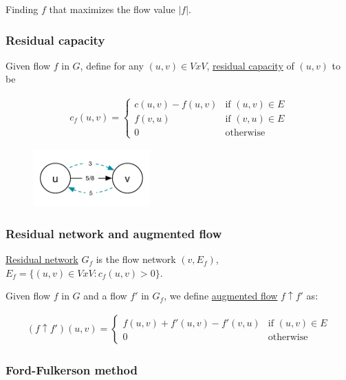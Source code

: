 \documentclass[12pt]{article}
\begin{document}
Finding $f$ that maximizes the flow value $|f|$.

\subsubsection*{Residual capacity}

Given flow $f$ in $G$, define for any $(u,v) \in VxV$, \underline{residual capacity} of $(u,v)$ to be

\begin{align*}
  c_f(u,v) = \begin{cases}
               c(u,v) - f(u,v) & \text{if } (u,v) \in E\\
               f(v,u)          & \text{if } (v,u) \in E\\
               0               & \text{otherwise}
           \end{cases}
\end{align*}

\begin{figure}[h!]
  \centering
    \includegraphics[width=0.4\textwidth]{figures/2}
\end{figure}

\subsubsection*{Residual network and augmented flow}

\underline{Residual network} $G_f$ is the flow network $(v, E_f)$, $E_f = \{ (u,v) \in VxV : c_f(u,v) > 0\}$.

Given flow $f$ in $G$ and a flow $f'$ in $G_f$, we define \underline{augmented flow} $f \uparrow f'$ as:

\begin{align*}
  (f \uparrow f')(u,v) = \begin{cases}
                          f(u,v) + f'(u,v) - f'(v,u) & \text{if } (u,v) \in E\\
                          0                          & \text{otherwise}
                         \end{cases}
\end{align*}

\subsubsection*{Ford-Fulkerson method}
\end{document}
